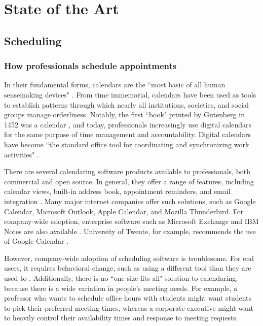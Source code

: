 \documentclass{article}
\begin{document}
\newpage

\section{State of the Art}

\subsection{Scheduling}

\subsubsection{How professionals schedule appointments}

In their fundamental forms, calendars are the ``most basic of all human sensemaking devices" \cite{wajcman_digital_2019}. From time immemorial, calendars have been used as tools to establish patterns through which nearly all institutions, societies, and social groups manage orderliness. Notably, the first ``book" printed by Gutenberg in 1452 was a calendar \cite{editors_printing_nodate}, and today, professionals increasingly use digital calendars for the same purpose of time management and accountability. Digital calendars have become ``the standard office tool for coordinating and synchronizing work activities" \cite{wajcman_digital_2019}.

There are several calendaring software products available to professionals, both commercial and open source. In general, they offer a range of features, including calendar views, built-in address book, appointment reminders, and email integration \cite{noauthor_top_2019}. Many major internet companies offer such solutions, such as Google Calendar, Microsoft Outlook, Apple Calendar, and Mozilla Thunderbird. For company-wide adoption, enterprise software such as Microsoft Exchange and IBM Notes are also available \cite{masli_design_2011}. University of Twente, for example, recommends the use of Google Calendar \cite{noauthor_home_nodate}.

However, company-wide adoption of scheduling software is troublesome. For end users, it requires behavioral change, such as using a different tool than they are used to \cite{ehrlich_strategies_1987}. Additionally, there is no ``one size fits all" solution to calendaring, because there is a wide variation in people's meeting needs. For example, a professor who wants to schedule office hours with students might want students to pick their preferred meeting times, whereas a corporate executive might want to heavily control their availability times and response to meeting requests.
\end{document}
